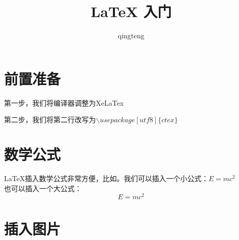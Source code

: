 \documentclass{article}
\title{LaTeX 入门}
\author{qingteng}
\begin{document}
\maketitle
\section{前置准备}
第一步，我们将编译器调整为XeLaTex\par
第二步，我们将第二行改写为$\backslash
usepackage [utf8] \{ctex\}$ 

\section{数学公式}
LaTeX插入数学公式非常方便，比如。我们可以插入一个小公式：$E = mc^2$\\ 
也可以插入一个大公式：
$$E = m c^2$$


\section{插入图片}
\begin{figure}
    \centering
     
\end{figure}
\end{document}
